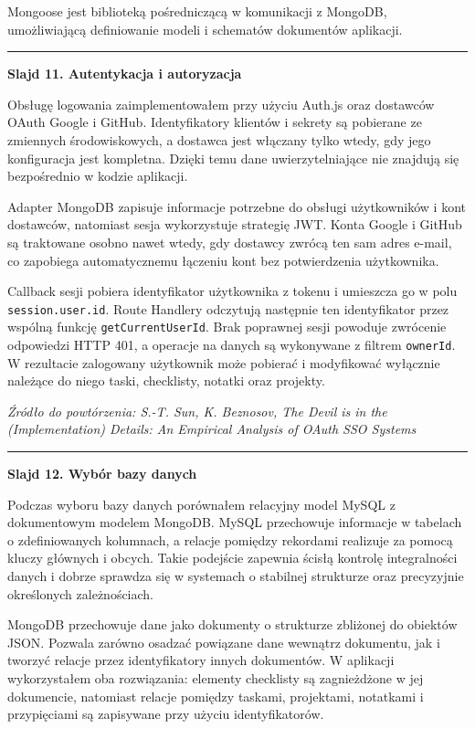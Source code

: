 \documentclass[12pt,a4paper]{article}
\newif\iffirstslide
\newcommand{\Slide}[2]{%
  \iffirstslide
    \global\firstslidefalse
  \else
    \par\vspace{1.5\baselineskip}%
    \noindent\rule{\textwidth}{0.8pt}%
    \par\vspace{1.5\baselineskip}%
  \fi
  {\LARGE\bfseries Slajd #1. #2\par}%
  \vspace{2\baselineskip}%
}
\newcommand{\Source}[1]{%
  \par\vspace{0.5\baselineskip}%
  {\small\itshape Źródło do powtórzenia: #1\par}%
}
\begin{document}
Mongoose jest biblioteką pośredniczącą w komunikacji z MongoDB, umożliwiającą definiowanie modeli i schematów dokumentów aplikacji.

\Slide{11}{Autentykacja i autoryzacja}

Obsługę logowania zaimplementowałem przy użyciu Auth.js oraz dostawców OAuth Google i GitHub. Identyfikatory klientów i sekrety są pobierane ze zmiennych środowiskowych, a dostawca jest włączany tylko wtedy, gdy jego konfiguracja jest kompletna. Dzięki temu dane uwierzytelniające nie znajdują się bezpośrednio w kodzie aplikacji.

Adapter MongoDB zapisuje informacje potrzebne do obsługi użytkowników i kont dostawców, natomiast sesja wykorzystuje strategię JWT. Konta Google i GitHub są traktowane osobno nawet wtedy, gdy dostawcy zwrócą ten sam adres e-mail, co zapobiega automatycznemu łączeniu kont bez potwierdzenia użytkownika.

Callback sesji pobiera identyfikator użytkownika z tokenu i umieszcza go w polu \nolinkurl{session.user.id}. Route Handlery odczytują następnie ten identyfikator przez wspólną funkcję \nolinkurl{getCurrentUserId}. Brak poprawnej sesji powoduje zwrócenie odpowiedzi HTTP 401, a operacje na danych są wykonywane z filtrem \nolinkurl{ownerId}. W rezultacie zalogowany użytkownik może pobierać i modyfikować wyłącznie należące do niego taski, checklisty, notatki oraz projekty.

\Source{S.-T. Sun, K. Beznosov, \emph{The Devil is in the (Implementation) Details: An Empirical Analysis of OAuth SSO Systems}}

\Slide{12}{Wybór bazy danych}

Podczas wyboru bazy danych porównałem relacyjny model MySQL z dokumentowym modelem MongoDB. MySQL przechowuje informacje w tabelach o zdefiniowanych kolumnach, a relacje pomiędzy rekordami realizuje za pomocą kluczy głównych i obcych. Takie podejście zapewnia ścisłą kontrolę integralności danych i dobrze sprawdza się w systemach o stabilnej strukturze oraz precyzyjnie określonych zależnościach.

MongoDB przechowuje dane jako dokumenty o strukturze zbliżonej do obiektów JSON. Pozwala zarówno osadzać powiązane dane wewnątrz dokumentu, jak i tworzyć relacje przez identyfikatory innych dokumentów. W aplikacji wykorzystałem oba rozwiązania: elementy checklisty są zagnieżdżone w jej dokumencie, natomiast relacje pomiędzy taskami, projektami, notatkami i przypięciami są zapisywane przy użyciu identyfikatorów.
\end{document}
